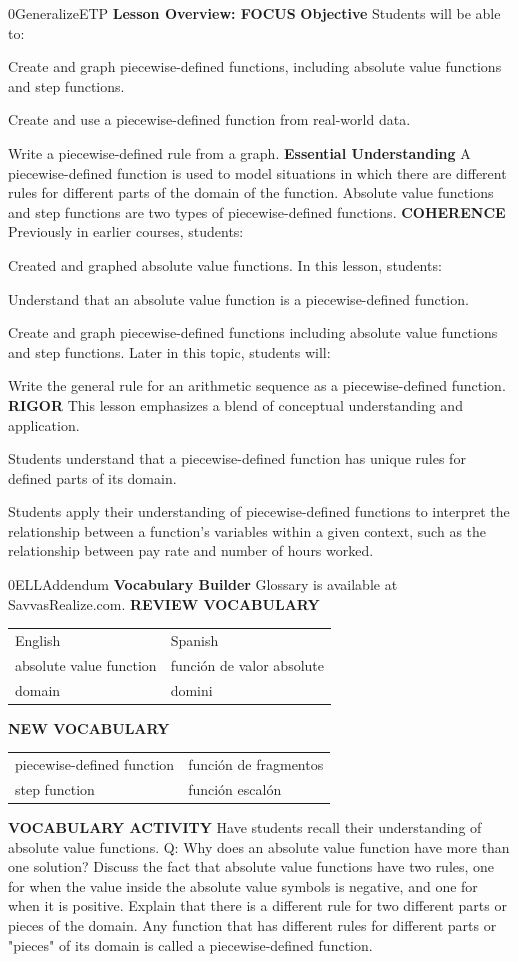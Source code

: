 \documentclass{article}
\newenvironment{te-addendum}[2]{}{}     %
\begin{document}
\begin{te-addendum}{0}{GeneralizeETP}
\textbf{Lesson Overview: FOCUS}
\textbf{Objective} Students will be able to:
\item Create and graph piecewise-defined functions, including absolute value functions and step functions.
\item Create and use a piecewise-defined function from real-world data.
\item Write a piecewise-defined rule from a graph.
\textbf{Essential Understanding}
A piecewise-defined function is used to model situations in which there are different rules for different parts of the domain of the function. Absolute value functions and step functions are two types of piecewise-defined functions.
\textbf{COHERENCE}
Previously in earlier courses, students:
\item Created and graphed absolute value functions.
In this lesson, students:
\item Understand that an absolute value function is a piecewise-defined function.
\item Create and graph piecewise-defined functions including absolute value functions and step functions.
Later in this topic, students will:
\item Write the general rule for an arithmetic sequence as a piecewise-defined function.
\textbf{RIGOR}
This lesson emphasizes a blend of conceptual understanding and application.
\item Students understand that a piecewise-defined function has unique rules for defined parts of its domain.
\item Students apply their understanding of piecewise-defined functions to interpret the relationship between a function's variables within a given context, such as the relationship between pay rate and number of hours worked.
\end{te-addendum}
\begin{te-addendum}{0}{ELLAddendum}
\textbf{Vocabulary Builder}
Glossary is available at SavvasRealize.com.
\textbf{REVIEW VOCABULARY}
\begin{tabular}{ll}
English & Spanish \\
absolute value function & función de valor absolute \\
domain & domini \\
\end{tabular}
\textbf{NEW VOCABULARY}
\begin{tabular}{ll}
piecewise-defined function & función de fragmentos \\
step function & función escalón \\
\end{tabular}
\textbf{VOCABULARY ACTIVITY}
Have students recall their understanding of absolute value functions.
Q: Why does an absolute value function have more than one solution?
Discuss the fact that absolute value functions have two rules, one for when the value inside the absolute value symbols is negative, and one for when it is positive. Explain that there is a different rule for two different parts or pieces of the domain. Any function that has different rules for different parts or "pieces" of its domain is called a piecewise-defined function.
\end{te-addendum}
\end{document}
